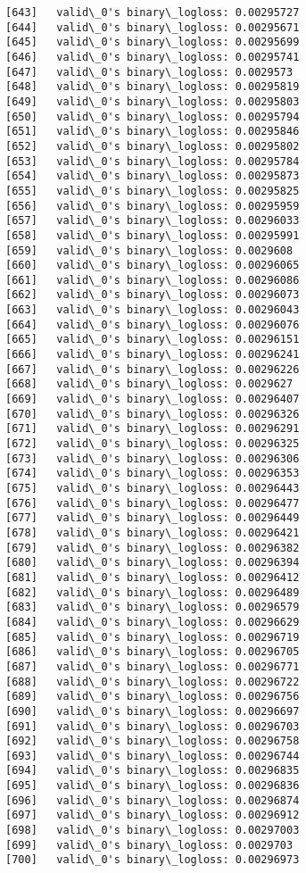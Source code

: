 \documentclass[11pt]{article}
\begin{document}
\begin{Verbatim}[commandchars=\\\{\}]
[643]	valid\_0's binary\_logloss: 0.00295727
[644]	valid\_0's binary\_logloss: 0.00295671
[645]	valid\_0's binary\_logloss: 0.00295699
[646]	valid\_0's binary\_logloss: 0.00295741
[647]	valid\_0's binary\_logloss: 0.0029573
[648]	valid\_0's binary\_logloss: 0.00295819
[649]	valid\_0's binary\_logloss: 0.00295803
[650]	valid\_0's binary\_logloss: 0.00295794
[651]	valid\_0's binary\_logloss: 0.00295846
[652]	valid\_0's binary\_logloss: 0.00295802
[653]	valid\_0's binary\_logloss: 0.00295784
[654]	valid\_0's binary\_logloss: 0.00295873
[655]	valid\_0's binary\_logloss: 0.00295825
[656]	valid\_0's binary\_logloss: 0.00295959
[657]	valid\_0's binary\_logloss: 0.00296033
[658]	valid\_0's binary\_logloss: 0.00295991
[659]	valid\_0's binary\_logloss: 0.0029608
[660]	valid\_0's binary\_logloss: 0.00296065
[661]	valid\_0's binary\_logloss: 0.00296086
[662]	valid\_0's binary\_logloss: 0.00296073
[663]	valid\_0's binary\_logloss: 0.00296043
[664]	valid\_0's binary\_logloss: 0.00296076
[665]	valid\_0's binary\_logloss: 0.00296151
[666]	valid\_0's binary\_logloss: 0.00296241
[667]	valid\_0's binary\_logloss: 0.00296226
[668]	valid\_0's binary\_logloss: 0.0029627
[669]	valid\_0's binary\_logloss: 0.00296407
[670]	valid\_0's binary\_logloss: 0.00296326
[671]	valid\_0's binary\_logloss: 0.00296291
[672]	valid\_0's binary\_logloss: 0.00296325
[673]	valid\_0's binary\_logloss: 0.00296306
[674]	valid\_0's binary\_logloss: 0.00296353
[675]	valid\_0's binary\_logloss: 0.00296443
[676]	valid\_0's binary\_logloss: 0.00296477
[677]	valid\_0's binary\_logloss: 0.00296449
[678]	valid\_0's binary\_logloss: 0.00296421
[679]	valid\_0's binary\_logloss: 0.00296382
[680]	valid\_0's binary\_logloss: 0.00296394
[681]	valid\_0's binary\_logloss: 0.00296412
[682]	valid\_0's binary\_logloss: 0.00296489
[683]	valid\_0's binary\_logloss: 0.00296579
[684]	valid\_0's binary\_logloss: 0.00296629
[685]	valid\_0's binary\_logloss: 0.00296719
[686]	valid\_0's binary\_logloss: 0.00296705
[687]	valid\_0's binary\_logloss: 0.00296771
[688]	valid\_0's binary\_logloss: 0.00296722
[689]	valid\_0's binary\_logloss: 0.00296756
[690]	valid\_0's binary\_logloss: 0.00296697
[691]	valid\_0's binary\_logloss: 0.00296703
[692]	valid\_0's binary\_logloss: 0.00296758
[693]	valid\_0's binary\_logloss: 0.00296744
[694]	valid\_0's binary\_logloss: 0.00296835
[695]	valid\_0's binary\_logloss: 0.00296836
[696]	valid\_0's binary\_logloss: 0.00296874
[697]	valid\_0's binary\_logloss: 0.00296912
[698]	valid\_0's binary\_logloss: 0.00297003
[699]	valid\_0's binary\_logloss: 0.0029703
[700]	valid\_0's binary\_logloss: 0.00296973

\end{Verbatim}
\end{document}
